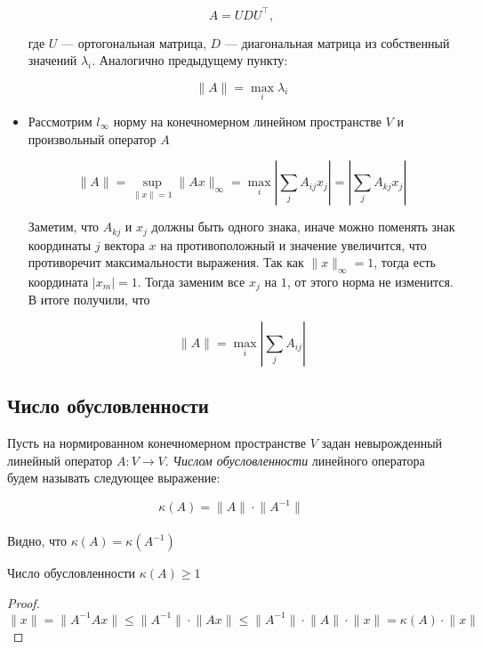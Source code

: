 \begin{itemize}
    \[
    A = U D U^{\top},
    \]

    где $U$ --- ортогональная матрица, $D$ --- диагональная матрица из собственный значений $\lambda_i$. Аналогично предыдущему пункту:

    \[
    \lVert A \rVert = \max\limits_{i} \lambda_i
    \]

    \item Рассмотрим $l_{\infty}$ норму на конечномерном линейном пространстве $V$ и произвольный оператор $A$

    \[
    \lVert A \rVert = \sup\limits_{\lVert x \rVert = 1} \lVert Ax \rVert_{\infty} = \max\limits_{i} \left|\sum\limits_j A_{ij} x_j\right| = \left| \sum\limits_j A_{kj} x_j \right|
    \]

    Заметим, что $A_{kj}$ и $x_j$ должны быть одного знака, иначе можно поменять знак координаты $j$ вектора $x$ на противоположный и значение увеличится, что противоречит максимальности выражения. Так как $\lVert x \rVert_{\infty} = 1$, тогда есть координата $|x_m| = 1$. Тогда заменим все $x_j$ на $1$, от этого норма не изменится. В итоге получили, что

    \[
    \lVert A \rVert = \max\limits_{i} \left|\sum\limits_j A_{ij}\right|
    \]
\end{itemize}

\subsection{Число обусловленности}

\begin{definition}
    Пусть на нормированном конечномерном пространстве $V$ задан невырожденный линейный оператор $A: V \longrightarrow V$. \textit{Числом обусловленности} линейного оператора будем называть следующее выражение:

    \[
    \kappa(A) = \lVert A \rVert \cdot \lVert A^{-1} \rVert
    \]
    \\Видно, что $\kappa(A) = \kappa(A^{-1})$
\end{definition}

\begin{claim}
    Число обусловленности $\kappa(A) \geqslant 1$
\end{claim}

\begin{proof}
    \[
    \lVert x \rVert = \lVert A^{-1}Ax \rVert \leqslant \lVert A^{-1} \rVert \cdot \lVert Ax \rVert \leqslant \lVert A^{-1} \rVert \cdot \lVert A \rVert \cdot \lVert x \rVert = \kappa(A) \cdot \lVert x \rVert
    \]
\end{proof}

